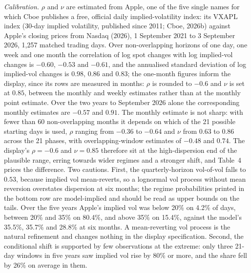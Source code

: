 \documentclass[11pt,a4paper]{article}
\begin{document}
\emph{Calibration.} $\rho$ and $\nu$ are estimated from Apple, one of the five single names for which Cboe publishes a free, official daily implied-volatility index: its VXAPL index (30-day implied volatility, published since 2011; Cboe, 2026b) against Apple's closing prices from Nasdaq (2026), 1 September 2021 to 3 September 2026, 1,257 matched trading days. Over non-overlapping horizons of one day, one week and one month the correlation of log spot changes with log implied-vol changes is $-0.60$, $-0.53$ and $-0.61$, and the annualised standard deviation of log implied-vol changes is $0.98$, $0.86$ and $0.83$; the one-month figures inform the display, since its rows are measured in months: $\rho$ is rounded to $-0.6$ and $\nu$ is set at $0.85$, between the monthly and weekly estimates rather than at the monthly point estimate. Over the two years to September 2026 alone the corresponding monthly estimates are $-0.57$ and $0.91$. The monthly estimate is not sharp: with fewer than 60 non-overlapping months it depends on which of the 21 possible starting days is used, $\rho$ ranging from $-0.36$ to $-0.64$ and $\nu$ from $0.63$ to $0.86$ across the 21 phases, with overlapping-window estimates of $-0.48$ and $0.74$. The display's $\rho = -0.6$ and $\nu = 0.85$ therefore sit at the high-dispersion end of the plausible range, erring towards wider regimes and a stronger shift, and Table~4 prices the difference. Two cautions. First, the quarterly-horizon vol-of-vol falls to $0.53$, because implied vol mean-reverts, so a lognormal vol process without mean reversion overstates dispersion at six months; the regime probabilities printed in the bottom row are model-implied and should be read as upper bounds on the tails. Over the five years Apple's implied vol was below 20\% on 4.2\% of days, between 20\% and 35\% on 80.4\%, and above 35\% on 15.4\%, against the model's 35.5\%, 35.7\% and 28.8\% at six months. A mean-reverting vol process is the natural refinement and changes nothing in the display specification. Second, the conditional shift is supported by few observations at the extreme: only three 21-day windows in five years saw implied vol rise by 80\% or more, and the share fell by 26\% on average in them.
\end{document}
